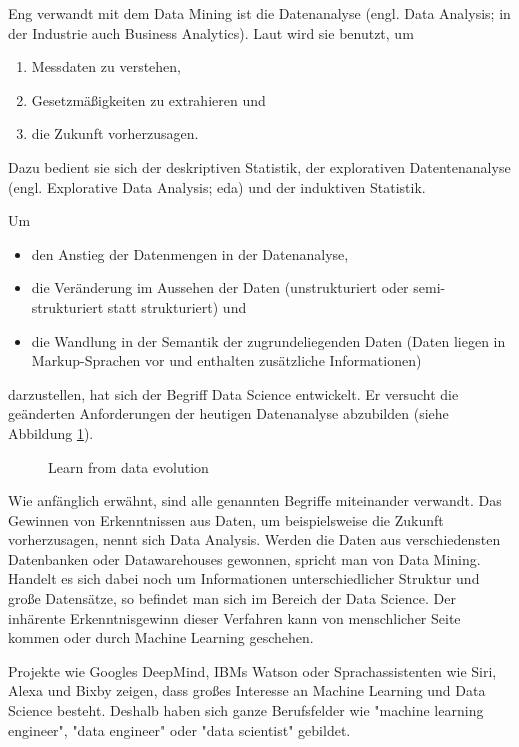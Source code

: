 Eng verwandt mit dem Data Mining ist die Datenanalyse (engl. Data Analysis; in der Industrie auch Business Analytics\citep[S.~58]{swamynathan_mastering_2017}). Laut \citep[S.~2; Teil 1]{hertle_datenanalyse_2016} wird sie benutzt, um
\begin{enumerate}
\item Messdaten zu verstehen,
\item Gesetzmäßigkeiten zu extrahieren und
\item die Zukunft vorherzusagen.
\end{enumerate}
Dazu bedient sie sich der deskriptiven Statistik, der explorativen Datentenanalyse (engl. Explorative Data Analysis; \gls{eda}) und der induktiven Statistik\citep[S.~17]{hertle_datenanalyse_2016}.\par
Um 
\begin{itemize}
\item den Anstieg der Datenmengen in der Datenanalyse,
\item die Veränderung im Aussehen der Daten (unstrukturiert oder semi-strukturiert statt strukturiert) und
\item die Wandlung in der Semantik der zugrundeliegenden Daten (Daten liegen in Markup-Sprachen vor und enthalten zusätzliche Informationen)
\end{itemize}
darzustellen, hat sich der Begriff Data Science entwickelt\citep{dhar_data_2013}. Er versucht die geänderten Anforderungen der heutigen Datenanalyse abzubilden (siehe Abbildung \ref{fig:dataEvolution}).

\begin{figure}[H]
\centering
{}
\caption{Learn from data evolution \citep[S.~66]{swamynathan_mastering_2017}}
\label{fig:dataEvolution}
\end{figure}
Wie anfänglich erwähnt, sind alle genannten Begriffe miteinander verwandt. Das Gewinnen von Erkenntnissen aus Daten, um beispielsweise die Zukunft vorherzusagen, nennt sich Data Analysis. Werden die Daten aus verschiedensten Datenbanken oder Datawarehouses gewonnen, spricht man von Data Mining. Handelt es sich dabei noch um Informationen unterschiedlicher Struktur und große Datensätze, so befindet man sich im Bereich der Data Science. Der inhärente Erkenntnisgewinn dieser Verfahren kann von menschlicher Seite kommen oder durch Machine Learning geschehen.\par
Projekte wie Googles DeepMind\citep{deepmind_deepmind_2017}, IBMs Watson\citep{ibm_ibm_2017} oder Sprachassistenten wie Siri, Alexa und Bixby zeigen, dass großes Interesse an Machine Learning und Data Science besteht. Deshalb haben sich ganze Berufsfelder wie "machine learning engineer", "data engineer" oder "data scientist"\citep[S.~1]{ramasubramanian_machine_2017} gebildet.


